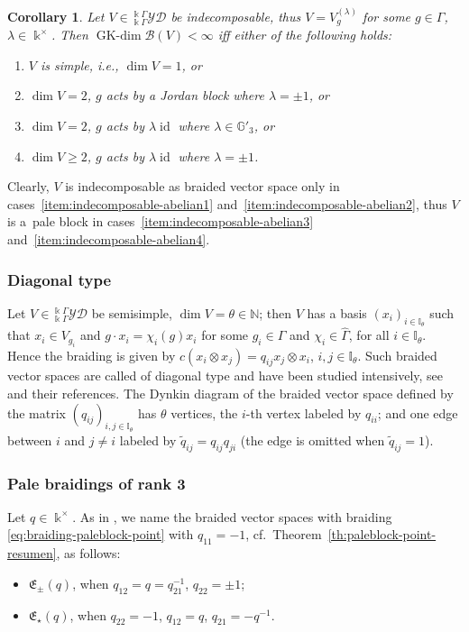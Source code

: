 \documentclass[10pt,a4paper]{amsart}
\numberwithin{equation}{section}
\newtheorem{Corollary}[Theorem]{Corollary}
\newcommand{\GK}{\operatorname{GK-dim}}
\newcommand{\id}{\operatorname{id}}
\newcommand{\toba}{\mathscr B}
\newcommand{\G}{{\mathbb G}}
\newcommand{\I}{{\mathbb I}}
\newcommand{\N}{{\mathbb N}}
\newcommand{\eny}{\mathfrak{E}}
\newcommand{\yd}[1]{{}_{#1}^{#1}\mathcal{YD}}
\newcommand{\VGamma}{\widehat{\Gamma}}
\begin{document}
\begin{Corollary}\label{coro:indecomposable-abelian}
Let $V \in \yd{\Bbbk\Gamma}$ be indecomposable, thus $V = V_{g}^{(\lambda)}$
for some $g\in \Gamma$, $\lambda\in \Bbbk^{\times}$. Then $\GK\toba(V) <\infty$
iff either of the following holds:
\begin{enumerate}[label=$(\alph*)$]\itemsep=0pt
\item\label{item:indecomposable-abelian1} $V$ is simple, i.e., $\dim V = 1$, or

\item\label{item:indecomposable-abelian2} $\dim V = 2$, $g$ acts by a Jordan block where $\lambda = \pm 1$, or

\item\label{item:indecomposable-abelian3} $\dim V = 2$, $g$ acts by $\lambda \id$ where $\lambda \in \G'_3$, or

\item\label{item:indecomposable-abelian4} $\dim V \geq 2$, $g$ acts by $\lambda \id$ where $\lambda = \pm 1$.
\end{enumerate}
\end{Corollary}
Clearly, $V$ is indecomposable as braided vector space only in cases~\ref{item:indecomposable-abelian1}
and~\ref{item:indecomposable-abelian2}, thus $V$ is a~pale block in cases~\ref{item:indecomposable-abelian3}
and~\ref{item:indecomposable-abelian4}.

\subsubsection{Diagonal type}\label{subsec:diagonal-type} Let $V \in \yd{\Bbbk\Gamma}$ be semisimple, $\dim V = \theta \in \N$; then
$V$ has a basis $(x_i)_{i\in \I_{\theta}}$ such that $x_i\in V_{g_i}$ and $g\cdot x_i = \chi_i(g) x_i$ for some $g_i\in \Gamma$
and $\chi_i\in \VGamma$, for all $i\in \I_{\theta}$. Hence the braiding is given by $c(x_i\otimes x_j) = q_{ij} x_j \otimes x_i$,
$i, j\in \I_{\theta}$. Such braided vector spaces are called of diagonal type and have been studied intensively, see
\cite{A-leyva,AA-diag-survey,AS,H-classif-RS} and their references.
The Dynkin diagram of the braided vector space defined by the matrix $(q_{ij})_{i, j\in \I_{\theta}}$ has $\theta$ vertices, the $i$-th
vertex labeled by $q_{ii}$; and one edge between $i$ and $j \neq i$ labeled by $\widetilde{q}_{ij} = q_{ij}q_{ji}$
(the edge is omitted when $\widetilde{q}_{ij} = 1$).


\subsubsection{Pale braidings of rank 3}%
Let $q\in \Bbbk^{\times}$. As in \cite{AAH-triang},
we name the braided vector spaces with braiding \eqref{eq:braiding-paleblock-point}
with $q_{11}= -1$, cf.~Theorem~\ref{th:paleblock-point-resumen}, as follows:
\begin{itemize}\itemsep=0pt
\item $\eny_{\pm}(q)$, when $q_{12} = q = q_{21}^{-1}$, $q_{22} = \pm 1$;
\item $\eny_{\star}(q)$, when $q_{22}=-1$, $q_{12}=q$, $q_{21}=-q^{-1}$.
\end{itemize}
\end{document}
